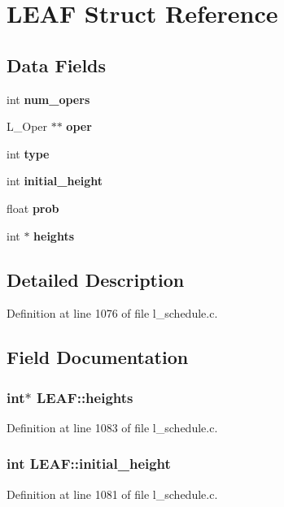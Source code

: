 \section{LEAF Struct Reference}
\label{structLEAF}
\subsection*{Data Fields}
\begin{CompactItemize}
\item 
int \bf{num\_\-opers}
\item 
L\_\-Oper $\ast$$\ast$ \bf{oper}
\item 
int \bf{type}
\item 
int \bf{initial\_\-height}
\item 
float \bf{prob}
\item 
int $\ast$ \bf{heights}
\end{CompactItemize}


\subsection{Detailed Description}




Definition at line 1076 of file l\_\-schedule.c.

\subsection{Field Documentation}
\subsubsection{\setlength{\rightskip}{0pt plus 5cm}int$\ast$ \bf{LEAF::heights}}\label{structLEAF_db3018de5e9d1f396b24bb9f89668457}




Definition at line 1083 of file l\_\-schedule.c.
\subsubsection{\setlength{\rightskip}{0pt plus 5cm}int \bf{LEAF::initial\_\-height}}\label{structLEAF_8af80c3770000ebaf3777a686587d87f}




Definition at line 1081 of file l\_\-schedule.c.
